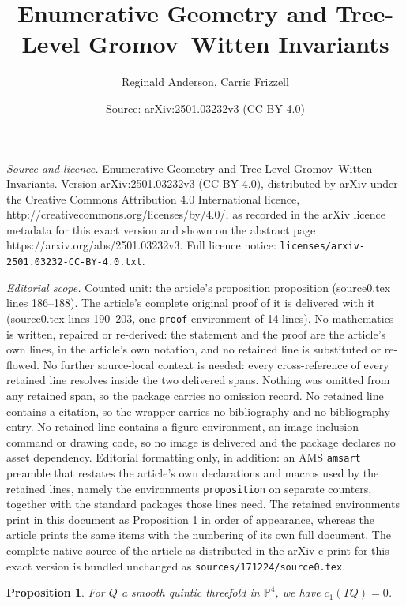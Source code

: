 \documentclass[10pt,a4paper]{amsart}
\title{Enumerative Geometry and Tree-Level Gromov--Witten Invariants}
\author{Reginald Anderson, Carrie Frizzell}
\date{Source: arXiv:2501.03232v3 (CC BY 4.0)}
\newtheorem{proposition}{Proposition}
\newcommand{\PP}{\mathbb{P}}\newcommand{\A}{\mathbb{A}}\newcommand{\Z}{\mathbb{Z}}\newcommand{\C}{\mathbb{C}}\newcommand{\N}{\mathbb{N}}\newcommand{\T}{\mathbb{T}}
\begin{document}
\maketitle

\noindent\emph{Source and licence.} Enumerative Geometry and Tree-Level Gromov--Witten Invariants. Version arXiv:2501.03232v3 (CC BY 4.0), distributed by arXiv under the Creative Commons Attribution 4.0 International licence, http://creativecommons.org/licenses/by/4.0/, as recorded in the arXiv licence metadata for this exact version and shown on the abstract page https://arxiv.org/abs/2501.03232v3. Full licence notice: \texttt{licenses/arxiv-2501.03232-CC-BY-4.0.txt}.\par\smallskip

\noindent\textit{Editorial scope.} Counted unit: the article's proposition proposition (source0.tex lines 186--188). The article's complete original proof of it is delivered with it (source0.tex lines 190--203, one \texttt{proof} environment of 14 lines). No mathematics is written, repaired or re-derived: the statement and the proof are the article's own lines, in the article's own notation, and no retained line is substituted or re-flowed.  No further source-local context is needed: every cross-reference of every retained line resolves inside the two delivered spans.  Nothing was omitted from any retained span, so the package carries no omission record.  No retained line contains a citation, so the wrapper carries no bibliography and no bibliography entry.  No retained line contains a figure environment, an image-inclusion command or drawing code, so no image is delivered and the package declares no asset dependency.  Editorial formatting only, in addition: an AMS \texttt{amsart} preamble that restates the article's own declarations and macros used by the retained lines, namely the environments \texttt{proposition} on separate counters, together with the standard packages those lines need.  The retained environments print in this document as Proposition 1 in order of appearance, whereas the article prints the same items with the numbering of its own full document.  The complete native source of the article as distributed in the arXiv e-print for this exact version is bundled unchanged as \texttt{sources/171224/source0.tex}.
\begin{proposition} For $Q$ a smooth quintic threefold in $\PP^4$, we have $c_1(TQ)=0$. 
    
\end{proposition}
\end{document}
